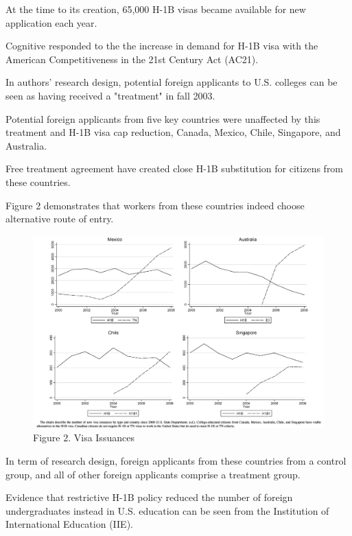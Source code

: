 \documentclass[../root]{subfiles}
\begin{document}
    At the time to its creation, 65,000 H-1B visas became available for new application each year.
    
    Cognitive responded to the the increase in demand for H-1B visa with the American Competitiveness in the 21st Century Act (AC21). 
    
    In authors' research design, potential foreign applicants to U.S. colleges can be seen as having received a "treatment" in fall 2003. 
    
    Potential foreign applicants from five key countries were unaffected by this treatment and H-1B visa cap reduction, Canada, Mexico, Chile, Singapore, and Australia.
    
    Free treatment agreement have created close H-1B substitution for citizens from these countries.
    
    Figure 2 demonstrates that workers from these countries indeed choose alternative route of entry.
    
    \begin{figure}
        \centering
        \includegraphics[width = \linewidth]{1016sugiyama/Figure_2.png}
        \caption{Figure 2. Visa Issuances}
        \label{fig:my_label}
    \end{figure}
    
    In term of research design, foreign applicants from these countries from a control group, and all of other foreign applicants comprise a treatment group.
    
    Evidence that restrictive H-1B policy reduced the number of foreign undergraduates instead in U.S. education can be seen from the Institution of  International Education (IIE).
   
\end{document}
